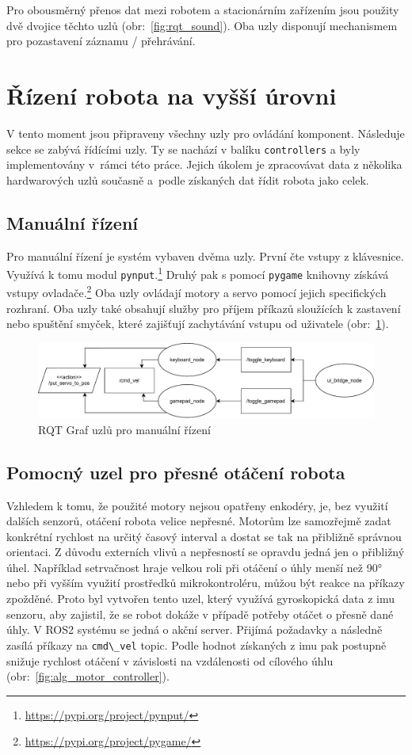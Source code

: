 Pro obousměrný přenos dat mezi robotem a stacionárním zařízením jsou použity dvě dvojice těchto uzlů (obr:~\ref{fig:rqt_sound}). Oba uzly disponují mechanismem pro pozastavení záznamu / přehrávání. 

\section{Řízení robota na vyšší úrovni}
V tento moment jsou připraveny všechny uzly pro ovládání komponent. Následuje sekce se zabývá řídícími uzly. Ty se nachází v balíku \verb|controllers| a byly implementovány v~rámci této práce. Jejich úkolem je zpracovávat data z několika hardwarových uzlů současně a~podle získaných dat řídit robota jako celek.

\subsection*{Manuální řízení}
Pro manuální řízení je systém vybaven dvěma uzly. První čte vstupy z klávesnice. Využívá k tomu modul \verb|pynput|.\footnote{\url{https://pypi.org/project/pynput/}} Druhý pak s pomocí \verb|pygame| knihovny získává vstupy ovladače.\footnote{\url{https://pypi.org/project/pygame/}} Oba uzly ovládají motory a servo pomocí jejich specifických rozhraní. Oba uzly také obsahují služby pro příjem příkazů sloužících k zastavení nebo spuštění smyček, které zajišťují zachytávání vstupu od uživatele (obr:~\ref{fig:rqt_manual}).

\begin{figure}[h!]
	\centering
	\includegraphics[scale=0.65]{obrazky-figures/manual_control_diagram.pdf}
	\caption{RQT Graf uzlů pro manuální řízení}
	\label{fig:rqt_manual}
\end{figure}

\subsection*{Pomocný uzel pro přesné otáčení robota}
Vzhledem k tomu, že použité motory nejsou opatřeny enkodéry, je, bez využití dalších senzorů, otáčení robota velice nepřesné. Motorům lze samozřejmě zadat konkrétní rychlost na určitý časový interval a dostat se tak na přibližně správnou orientaci. Z důvodu externích vlivů a nepřesností se opravdu jedná jen o přibližný úhel. Například setrvačnost hraje velkou roli při otáčení o úhly menší než 90° nebo při vyšším využití prostředků mikrokontroléru, můžou být reakce na příkazy zpožděné.
Proto byl vytvořen tento uzel, který využívá gyroskopická data z imu senzoru, aby zajistil, že se robot dokáže v případě potřeby otáčet o přesně dané úhly. V ROS2 systému se jedná o akční server. Přijímá požadavky a následně zasílá příkazy na \verb|cmd\_vel| topic. Podle hodnot získaných z imu pak postupně snižuje rychlost otáčení v závislosti na vzdálenosti od cílového úhlu (obr:~\ref{fig:alg_motor_controller}).

